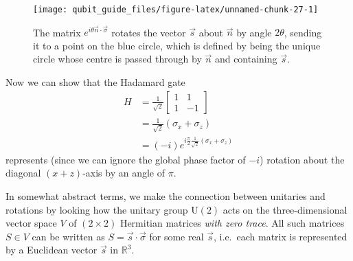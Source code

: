 \documentclass[fleqn,a4paper]{article}
\theoremstyle{definition}
\theoremstyle{definition}
\theoremstyle{definition}
\theoremstyle{definition}
\theoremstyle{remark}
\begin{document}
\begin{figure}[H]

{\centering \texttt{[image: qubit\_guide\_files/figure-latex/unnamed-chunk-27-1]} 

}

\caption{The matrix \(e^{i\theta\vec{n}\cdot\vec{\sigma}}\) rotates the vector \(\vec{s}\) about \(\vec{n}\) by angle \(2\theta\), sending it to a point on the blue circle, which is defined by being the unique circle whose centre is passed through by \(\vec{n}\) and containing \(\vec{s}\).}\label{fig:unnamed-chunk-27}
\end{figure}

Now we can show that the Hadamard gate
\[
  \begin{aligned}
    H
    &= \frac{1}{\sqrt{2}}
    \begin{bmatrix}
      1& 1
    \\1 & -1
    \end{bmatrix}
  \\&= \frac{1}{\sqrt{2}}(\sigma_x + \sigma_z)
  \\&= (-i)e^{i \frac{\pi}{2} \frac{1}{\sqrt{2}}(\sigma_x+\sigma_z)}
  \end{aligned}
\]
represents (since we can ignore the global phase factor of \(-i\)) rotation about the diagonal \((x+z)\)-axis by an angle of \(\pi\).

In somewhat abstract terms, we make the connection between unitaries and rotations by looking how the unitary group \(\mathrm{U}(2)\) acts on the three-dimensional vector space \(V\) of \((2\times 2)\) Hermitian matrices \emph{with zero trace}.
All such matrices \(S\in V\) can be written as \(S=\vec{s}\cdot\vec{\sigma}\) for some real \(\vec{s}\), i.e.~each matrix is represented by a Euclidean vector \(\vec{s}\) in \(\mathbb{R}^3\).
\end{document}

